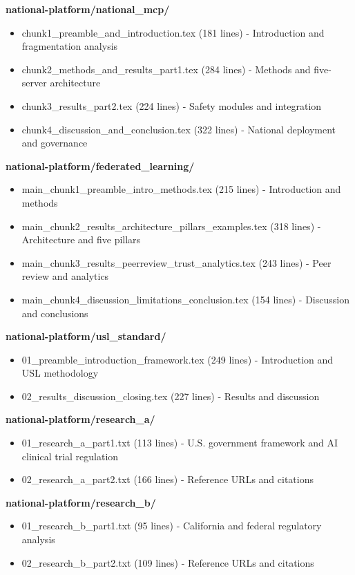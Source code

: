 \noindent\textbf{national-platform/national\_mcp/}
\begin{itemize}[nosep]
  \item chunk1\_preamble\_and\_introduction.tex (181 lines) - Introduction
    and fragmentation analysis
  \item chunk2\_methods\_and\_results\_part1.tex (284 lines) - Methods and
    five-server architecture
  \item chunk3\_results\_part2.tex (224 lines) - Safety modules and
    integration
  \item chunk4\_discussion\_and\_conclusion.tex (322 lines) - National
    deployment and governance
\end{itemize}

\noindent\textbf{national-platform/federated\_learning/}
\begin{itemize}[nosep]
  \item main\_chunk1\_preamble\_intro\_methods.tex (215 lines) - Introduction
    and methods
  \item main\_chunk2\_results\_architecture\_pillars\_examples.tex
    (318 lines) - Architecture and five pillars
  \item main\_chunk3\_results\_peerreview\_trust\_analytics.tex
    (243 lines) - Peer review and analytics
  \item main\_chunk4\_discussion\_limitations\_conclusion.tex (154 lines) -
    Discussion and conclusions
\end{itemize}

\noindent\textbf{national-platform/usl\_standard/}
\begin{itemize}[nosep]
  \item 01\_preamble\_introduction\_framework.tex (249 lines) - Introduction
    and USL methodology
  \item 02\_results\_discussion\_closing.tex (227 lines) - Results and
    discussion
\end{itemize}

\noindent\textbf{national-platform/research\_a/}
\begin{itemize}[nosep]
  \item 01\_research\_a\_part1.txt (113 lines) - U.S. government framework
    and AI clinical trial regulation
  \item 02\_research\_a\_part2.txt (166 lines) - Reference URLs and citations
\end{itemize}

\noindent\textbf{national-platform/research\_b/}
\begin{itemize}[nosep]
  \item 01\_research\_b\_part1.txt (95 lines) - California and federal
    regulatory analysis
  \item 02\_research\_b\_part2.txt (109 lines) - Reference URLs and citations
\end{itemize}

